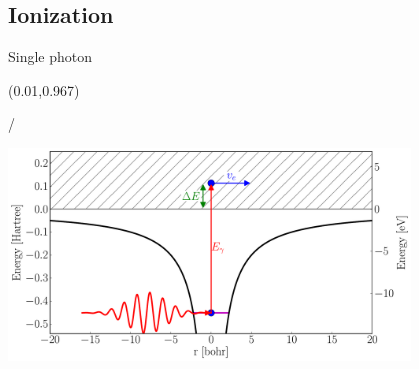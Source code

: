 \documentclass{beamer}
\makeatletter
\newcommand{\framenumber}{
\begin{textblock}{0}(0.01,0.967)
\begin{scriptsize}
{\color{gray}\insertframenumber/\inserttotalframenumber}
\end{scriptsize}
\end{textblock}
}
\makeatother
\begin{document}
\subsection{Ionization}
\begin{frame}{Single photon}\framenumber
\begin{center}
\includegraphics[width=0.8\textwidth]{../figures/ionization_single}
\end{center}
\end{frame}
\end{document}
